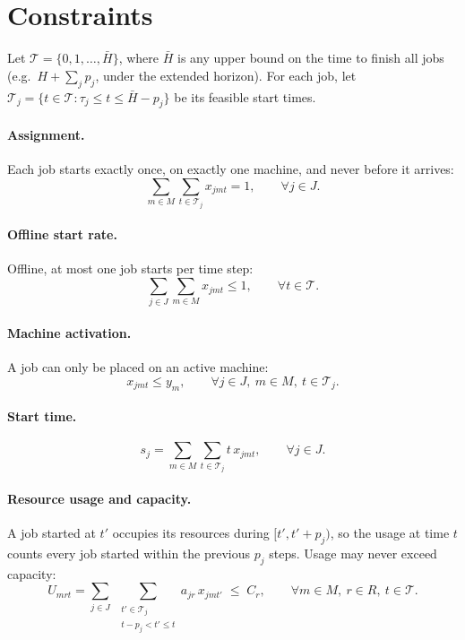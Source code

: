 \documentclass[12pt]{article}
\begin{document}
\section{Constraints}\label{sec:AppendixB}
Let $\mathcal{T} = \{0, 1, \dots, \bar{H}\}$, where $\bar{H}$ is any upper bound on the time to finish all jobs (e.g.\ $H + \sum_j p_j$, under the extended horizon). For each job, let $\mathcal{T}_j = \{t \in \mathcal{T} : \tau_j \le t \le \bar{H} - p_j\}$ be its feasible start times.

\paragraph{Assignment.} Each job starts exactly once, on exactly one machine, and never before it arrives:
\begin{equation}\label{con:assign}
    \sum_{m \in M} \sum_{t \in \mathcal{T}_j} x_{jmt} = 1, \qquad \forall j \in J.
\end{equation}
\paragraph{Offline start rate.} Offline, at most one job starts per time step:
\begin{equation}\label{con:one-start}
    \sum_{j \in J} \sum_{m \in M} x_{jmt} \le 1, \qquad \forall t \in \mathcal{T}.
\end{equation}
\paragraph{Machine activation.} A job can only be placed on an active machine:
\begin{equation}\label{con:machine-use}
    x_{jmt} \le y_m, \qquad \forall j \in J,\ m \in M,\ t \in \mathcal{T}_j.
\end{equation}
\paragraph{Start time.}
\begin{equation}\label{con:start-time}
    s_j = \sum_{m \in M} \sum_{t \in \mathcal{T}_j} t\, x_{jmt}, \qquad \forall j \in J.
\end{equation}
\paragraph{Resource usage and capacity.} A job started at $t'$ occupies its resources during $[t', t'+p_j)$, so the usage at time $t$ counts every job started within the previous $p_j$ steps. Usage may never exceed capacity:
\begin{equation}\label{con:resource-usage}
    U_{mrt} = \sum_{j \in J} \; \sum_{\substack{t' \in \mathcal{T}_j \\ t - p_j < t' \le t}} a_{jr}\, x_{jmt'} \;\le\; C_r, \qquad \forall m \in M,\ r \in R,\ t \in \mathcal{T}.
\end{equation}
\end{document}
